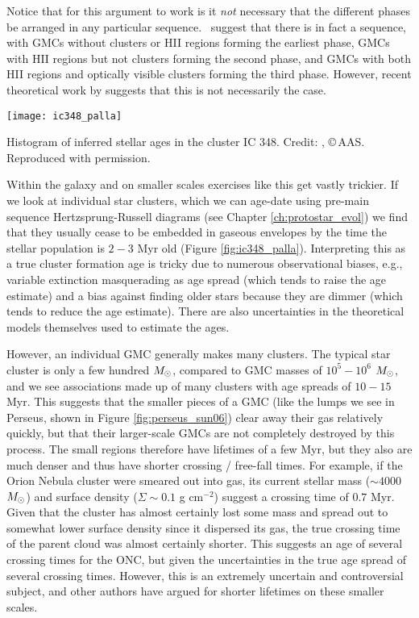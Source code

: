 Notice that for this argument to work is it {\it not} necessary that the different phases be arranged in any particular sequence. \citeauthor{kawamura09a}~suggest that there is in fact a sequence, with GMCs without clusters or HII regions forming the earliest phase, GMCs with HII regions but not clusters forming the second phase, and GMCs with both HII regions and optically visible clusters forming the third phase. However, recent theoretical work by \citet{goldbaum11a} suggests that this is not necessarily the case.

\begin{marginfigure}
\texttt{[image: ic348\_palla]}
\caption[Histogram of stellar ages in IC 348]{
\label{fig:ic348_palla}
Histogram of inferred stellar ages in the cluster IC 348. Credit: \citet{palla00a}, \copyright\,AAS. Reproduced with permission.
}
\end{marginfigure}

Within the galaxy and on smaller scales exercises like this get vastly trickier. If we look at individual star clusters, which we can age-date using pre-main sequence Hertzsprung-Russell diagrams (see Chapter \ref{ch:protostar_evol}) we find that they usually cease to be embedded in gaseous envelopes by the time the stellar population is $2-3$ Myr old (Figure \ref{fig:ic348_palla}). Interpreting this as a true cluster formation age is tricky due to numerous observational biases, e.g., variable extinction masquerading as age spread (which tends to raise the age estimate) and a bias against finding older stars because they are dimmer (which tends to reduce the age estimate). There are also uncertainties in the theoretical models themselves used to estimate the ages.

However, an individual GMC generally makes many clusters. The typical star cluster is only a few hundred $M_{\odot}$, compared to GMC masses of $10^5-10^6$ $M_{\odot}$, and we see associations made up of many clusters with age spreads of $10-15$ Myr. This suggests that the smaller pieces of a GMC (like the lumps we see in Perseus, shown in Figure \ref{fig:perseus_sun06}) clear away their gas relatively quickly, but that their larger-scale GMCs are not completely destroyed by this process.  The small regions therefore have lifetimes of a few Myr, but they also are much denser and thus have shorter crossing / free-fall times. For example, if the Orion Nebula cluster were smeared out into gas, its current stellar mass ($\sim 4000$ $M_{\odot}$) and surface density ($\Sigma \sim 0.1$ g cm$^{-2}$) suggest a crossing time of $0.7$ Myr. Given that the cluster has almost certainly lost some mass and spread out to somewhat lower surface density since it dispersed its gas, the true crossing time of the parent cloud was almost certainly shorter. This suggests an age of several crossing times for the ONC, but given the uncertainties in the true age spread of several crossing times. However, this is an extremely uncertain and controversial subject, and other authors have argued for shorter lifetimes on these smaller scales.

